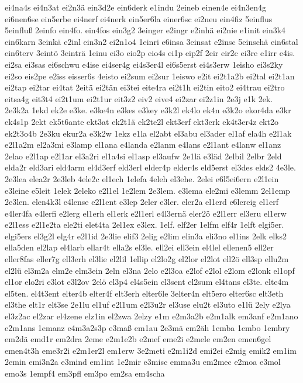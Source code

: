 {ei4na4s
ei4n3at
ei2n3ä
ein3d2e
ein6derk
e1indu
2eineb
einen4e
ei4n3en4g
ei6nen6se
ein5erbe
ei4nerf
ei4nerk
ein5er6la
einer6sc
ei2neu
ein4fiz
5einflus
5einfluß
2einfo
ein4fo.
ein4fos
ein3g2
3einger
e2ingr
e2inhä
ei2nie
e1init
ein3k4
ein6karn
3einkä
e2inl
ein3n2
ei2n1o4
1einri
e6insa
3einsat
e2insc
5einschä
ein6stal
ein6terv
3eintö
3einträ
1einu
ei3o
eio2p
eio4s
ei1p
eip2f
2eir
eir2c
ei3re
e1irr
e4is.
ei2sa
ei3sas
ei6schwu
e4ise
ei4ser4g
ei4s3er4l
ei6s5erst
ei4s3erw
1eisho
ei3s2ky
ei2so
eis2pe
e2iss
eisser6s
4eisto
ei2sum
ei2sur
1eiswo
e2it
ei2t1a2b
ei2tal
ei2t1an
ei2tap
ei2tar
ei4tat
2eitä
ei2tän
ei3tei
eite4ra
ei2t1h
ei2tin
eito2
ei4trau
ei2tro
eitsa4g
eit3t4
ei2t1um
ei2t1ur
eit3z2
eiv2
eive4
ei2zar
ei2z1in
2e3j
e1k
2ek.
2e3k2a
1ekd
ek2e
e3ke.
e3ke4n
e3kes
e3key
e3k2l
ek4lo
ek4n
e3k2o
ekor4da
e3kr
ek4s1p
2ekt
ek5t6ante
ekt3at
ek2t1ä
ek2te2l
ekt3erf
ekt3erk
ek4t3er4z
ekt2o
ek2t3o4b
2e3ku
ekur2a
e3k2w
1ekz
e1la
el2abt
el3abu
el3ader
el1af
ela4h
e2l1ak
e2l1a2m
el2a3mi
e3lamp
el1ana
e4landa
e2lanm
e4lans
e2l1ant
e4lanw
el1anz
2elao
e2l1ap
e2l1ar
el3a2ri
el1a4si
el1asp
el3aufw
2e1lä
e3läd
2elbil
2elbr
2eld
elda2r
eld3ari
eld4arm
el4d3erf
eld3erl
elder4p
elder4s
eld5erst
el3des
elds2
4e3le.
2e3lea
elea2r
2e3leb
4ele2c
el1ech
1elefa
4eleh
el3ehe.
2elei
e6l5ei6ern
e2l1ein
e3leine
e5leit
1elek
2eleko
e2l1el
1e2lem
2e3lem.
e3lema
ele2mi
e3lemm
2el1emp
2e3len.
elen4k3l
e4lense
e2l1ent
e3lep
2eler
e3ler.
eler2a
el1erd
e6lereig
el1erf
e4ler4fa
e4lerfi
e2lerg
el1erh
el1erk
e2l1erl
e4l3ernä
eler2ö
e2l1err
el3eru
el1erw
e2l1ess
e2l1e2ta
ele2ti
elet4ta
2el1ex
e3lex.
1elf.
elf2er
1elfm
elf4r
1elft
elgi5er.
elgi5ers
el3g2l
elg4r
e2l1id
2e3lie
elif3
2elig
e2lim
elin3a
eli3no
el1ins
2elk
elks2
ella5den
el2lap
el4larb
ellar4t
ella2s
el3le.
ell2ei
ell3ein
el4lel
ellenen5
ell2er
eller8fas
eller7g
ell3erh
el3lie
el2lil
1ellip
el2lo2g
el2lor
el2lot
ell2ö
ell3sp
ellu2m
el2lü
el3m2a
elm2e
elm3ein
2eln
el3na
2elo
e2l3oa
e2lof
e2lol
e2lom
e2lonk
el1opf
el1or
elo2ri
e3lot
e3l2ov
2elö
el3p4
el4s5ein
el3sent
el2sum
el4tans
el3te.
elte4m
el5ten.
el4t3ent
elter4b
elter4f
elt3erh
elter6le
3elter4n
elt5ero
elter6sc
elt3eth
el3the
elt1r
elt3se
2e1lu
el1uf
e2l1um
e2l3u2r
el3use
elu2t
el3uto
e1lü
2ely
e2lya
el3z2ac
el2zar
el4zene
elz1in
el2zwa
2elzy
e1m
e2m3a2b
e2m1alk
em3anf
e2m1ano
e2m1ans
1emanz
e4m3a2s3p
e3maß
em1au
2e3mä
em2äh
1emba
1embo
1embry
em2dä
emd1r
em2dra
2eme
e2m1e2b
e2mef
eme2i
e2mele
em2en
emen6gel
emen4t3h
eme3r2i
e2m1er2l
em1erw
3e2meti
e2m1i2d
emi2ei
e2mig
emik2
em1im
2emin
emi3n2a
e3mind
em1int
1e2mir
e3misc
emma3u
em2mec
e2moa
e3mol
emo3s
1empf4
em3pfl
em3po
em2sa
em4scha
}

